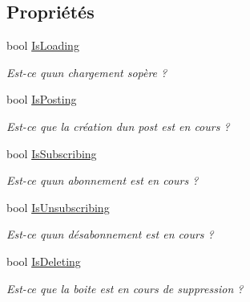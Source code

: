 \subsection*{Propriétés}
\begin{DoxyCompactItemize}
\item 
bool \hyperlink{class_boxes_1_1_view_models_1_1_box_view_model_a95c46ef0aac77f708e05826d159b0ff8}{Is\+Loading}
\begin{DoxyCompactList}\small\item\em Est-\/ce qu\textquotesingle{}un chargement s\textquotesingle{}opère ? \end{DoxyCompactList}\item 
bool \hyperlink{class_boxes_1_1_view_models_1_1_box_view_model_aebe8ce493cf812cceed6e4fcf715486f}{Is\+Posting}
\begin{DoxyCompactList}\small\item\em Est-\/ce que la création d\textquotesingle{}un post est en cours ? \end{DoxyCompactList}\item 
bool \hyperlink{class_boxes_1_1_view_models_1_1_box_view_model_a2e5d1c7c2e548e38a46529c9fe4ee765}{Is\+Subscribing}
\begin{DoxyCompactList}\small\item\em Est-\/ce qu\textquotesingle{}un abonnement est en cours ? \end{DoxyCompactList}\item 
bool \hyperlink{class_boxes_1_1_view_models_1_1_box_view_model_a657609eb5a4a5a25c7d377e5277cfd6d}{Is\+Unsubscribing}
\begin{DoxyCompactList}\small\item\em Est-\/ce qu\textquotesingle{}un désabonnement est en cours ? \end{DoxyCompactList}\item 
bool \hyperlink{class_boxes_1_1_view_models_1_1_box_view_model_ad64c3a1d77c24bf51232dd108c832fc6}{Is\+Deleting}
\begin{DoxyCompactList}\small\item\em Est-\/ce que la boite est en cours de suppression ? \end{DoxyCompactList}\item 

\end{DoxyCompactItemize}
